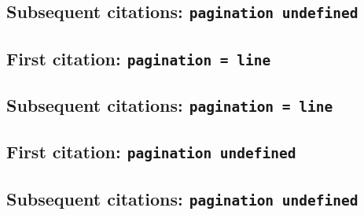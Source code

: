 \documentclass[a4paper]{article}
\begin{document}
\cite{heraclitus:epistle1}

\citereset
\cite[577]{heraclitus:epistle1}

\citereset
\cite[note]{heraclitus:epistle1}

\subsection{Subsequent citations: \texttt{pagination undefined}}

\cite{heraclitus:epistle1}

\cite[577]{heraclitus:epistle1}

\cite[note]{heraclitus:epistle1}

\subsection{First citation: \texttt{pagination = line}}

\cite{heraclitus:epistle1:a}

\citereset
\cite[10]{heraclitus:epistle1:a}

\citereset
\cite[note]{heraclitus:epistle1:a}

\subsection{Subsequent citations: \texttt{pagination = line}}

\cite{heraclitus:epistle1:a}

\cite[10]{heraclitus:epistle1:a}

\cite[note]{heraclitus:epistle1:a}

\subsection{First citation: \texttt{pagination undefined}}

\cite{augustine:letters}

\citereset
\cite[10]{augustine:letters}

\citereset
\AtNextCite{\renewcommand*{\volcitedelim}{\addcomma\space}}
\cite[note]{augustine:letters}

\subsection{Subsequent citations: \texttt{pagination undefined}}

\cite{augustine:letters}

\cite[10]{augustine:letters}
\end{document}

